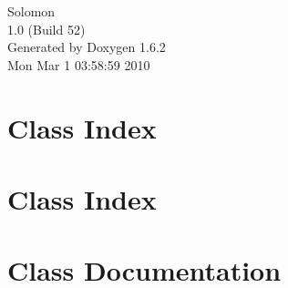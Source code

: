 \documentclass[a4paper]{book}
\begin{document}
\hypersetup{pageanchor=false}
\begin{titlepage}
\vspace*{7cm}
\begin{center}
{\Large Solomon \\[1ex]\large 1.0 (Build 52) }\\
\vspace*{1cm}
{\large Generated by Doxygen 1.6.2}\\
\vspace*{0.5cm}
{\small Mon Mar 1 03:58:59 2010}\\
\end{center}
\end{titlepage}
\clearemptydoublepage
{}
\tableofcontents
\clearemptydoublepage
{}
\hypersetup{pageanchor=true}
\chapter{Class Index}

\chapter{Class Index}

\chapter{Class Documentation}










\printindex
\end{document}
